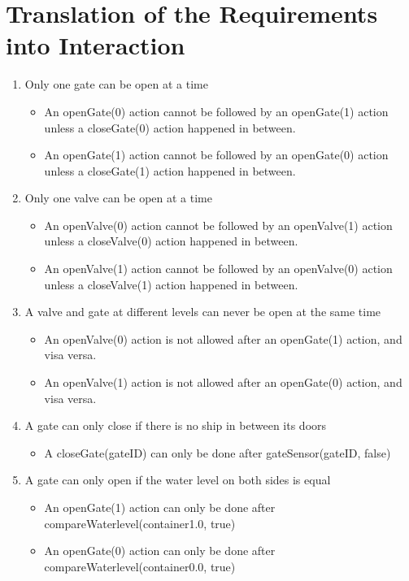 \section{Translation of the Requirements into Interaction}
\begin{enumerate}
	\item Only one gate can be open at a time
	
		\begin{itemize}
			\item An openGate(0) action cannot be followed by an openGate(1) action unless a closeGate(0) action happened in between.
			\item An openGate(1) action cannot be followed by an openGate(0) action unless a closeGate(1) action happened in between.
			
		\end{itemize}
	
	\item Only one valve can be open at a time
	
		\begin{itemize}
			\item An openValve(0) action cannot be followed by an openValve(1) action unless a closeValve(0) action happened in between.
			\item An openValve(1) action cannot be followed by an openValve(0) action unless a closeValve(1) action happened in between.
		\end{itemize}
	
	\item A valve and gate at different levels can never be open at the same time
		\begin{itemize}
			\item An openValve(0) action is not allowed after an openGate(1) action, and visa versa.
			\item An openValve(1) action is not allowed after an openGate(0) action, and visa versa.
		\end{itemize}
	
	\item A gate can only close if there is no ship in between its doors
	\begin{itemize}
		\item A closeGate(gateID) can only be done after gateSensor(gateID, false)
	\end{itemize}
	
	\item A gate can only open if the water level on both sides is equal
	\begin{itemize}
		\item An openGate(1) action can only be done after compareWaterlevel(container1.0, true)
		\item An openGate(0) action can only be done after compareWaterlevel(container0.0, true)


\end{itemize}
\end{enumerate}
